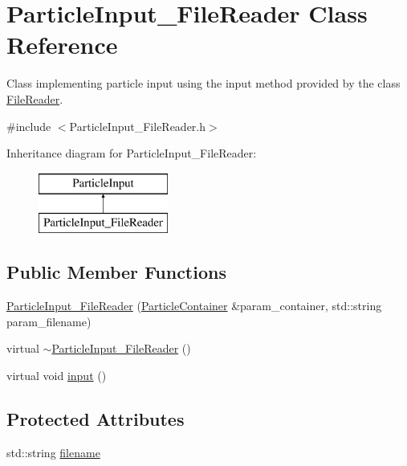 \hypertarget{classParticleInput__FileReader}{\section{Particle\-Input\-\_\-\-File\-Reader Class Reference}
\label{classParticleInput__FileReader}
}


Class implementing particle input using the input method provided by the class \hyperlink{classFileReader}{File\-Reader}.  




{\ttfamily \#include $<$Particle\-Input\-\_\-\-File\-Reader.\-h$>$}

Inheritance diagram for Particle\-Input\-\_\-\-File\-Reader\-:\begin{figure}[H]
\begin{center}
\leavevmode
\includegraphics[height=2.000000cm]{classParticleInput__FileReader}
\end{center}
\end{figure}
\subsection*{Public Member Functions}
\begin{DoxyCompactItemize}
\item 
\hyperlink{classParticleInput__FileReader_a6b402c9f8d50b42d2211d2139f3b2846}{Particle\-Input\-\_\-\-File\-Reader} (\hyperlink{classParticleContainer}{Particle\-Container} \&param\-\_\-container, std\-::string param\-\_\-filename)
\item 
virtual \hyperlink{classParticleInput__FileReader_a30c6861eca311721482afa3b677bc9d7}{$\sim$\-Particle\-Input\-\_\-\-File\-Reader} ()
\item 
virtual void \hyperlink{classParticleInput__FileReader_a67b437a1f7ff4e5a63d437ece6319257}{input} ()
\end{DoxyCompactItemize}
\subsection*{Protected Attributes}
\begin{DoxyCompactItemize}
\item 
std\-::string \hyperlink{classParticleInput__FileReader_ae53326191f7c998f8eae9313d86e9de6}{filename}
\end{DoxyCompactItemize}


